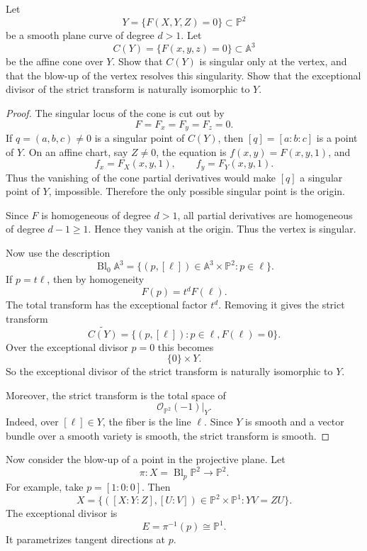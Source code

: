 \begin{exercise}
\label{exercise-cone-over-smooth-curve-blow-up}
Let
$$
Y=\{F(X,Y,Z)=0\}\subset \mathbb{P}^2
$$
be a smooth plane curve of degree $d>1$.
Let
$$
C(Y)=\{F(x,y,z)=0\}\subset \mathbb{A}^3
$$
be the affine cone over $Y$.
Show that $C(Y)$ is singular only at the vertex, and
that the blow-up of the vertex resolves this
singularity. Show that the exceptional divisor of the
strict transform is naturally isomorphic to $Y$.
\end{exercise}

\begin{proof}
The singular locus of the cone is cut out by
$$
F=F_x=F_y=F_z=0.
$$
If $q=(a,b,c)\neq 0$ is a singular point of
$C(Y)$, then $[q]=[a:b:c]$ is a point of $Y$.
On an affine chart, say $Z\neq 0$, the equation is
$f(x,y)=F(x,y,1)$, and
$$
f_x=F_X(x,y,1),
\qquad
f_y=F_Y(x,y,1).
$$
Thus the vanishing of the cone partial derivatives
would make $[q]$ a singular point of $Y$, impossible.
Therefore the only possible singular point is the
origin.

Since $F$ is homogeneous of degree $d>1$, all partial
 derivatives are homogeneous of degree $d-1\geq 1$.
Hence they vanish at the origin. Thus the vertex is
singular.

Now use the description
$$
\operatorname{Bl}_0\mathbb{A}^3
=
\{(p,[\ell])\in \mathbb{A}^3\times \mathbb{P}^2:
 p\in \ell\}.
$$
If $p=t\ell$, then by homogeneity
$$
F(p)=t^dF(\ell).
$$
The total transform has the exceptional factor $t^d$.
Removing it gives the strict transform
$$
\widetilde{C(Y)}
=
\{(p,[\ell]):p\in \ell, F(\ell)=0\}.
$$
Over the exceptional divisor $p=0$ this becomes
$$
\{0\}\times Y.
$$
So the exceptional divisor of the strict transform is
naturally isomorphic to $Y$.

Moreover, the strict transform is the total space of
$$
\mathcal{O}_{\mathbb{P}^2}(-1)|_Y.
$$
Indeed, over $[\ell]\in Y$, the fiber is the line
$\ell$. Since $Y$ is smooth and a vector bundle over a
smooth variety is smooth, the strict transform is
smooth.
\end{proof}

\medskip\noindent
Now consider the blow-up of a point in the projective
plane. Let
$$
\pi:X=\operatorname{Bl}_p\mathbb{P}^2\to
\mathbb{P}^2.
$$
For example, take $p=[1:0:0]$. Then
$$
X=
\{([X:Y:Z],[U:V])\in \mathbb{P}^2\times
\mathbb{P}^1:YV=ZU\}.
$$
The exceptional divisor is
$$
E=\pi^{-1}(p)\cong \mathbb{P}^1.
$$
It parametrizes tangent directions at $p$.

